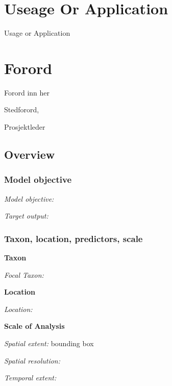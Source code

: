 \documentclass[11pt, a4paper]{article}
\begin{document}
\setcounter{secnumdepth}{0}
\section{Useage Or Application}
\normalsize{
Usage or Application} \\
\normalsize
\clearpage


\doublespacing
\tableofcontents
{}
\singlespacing
\clearpage

\section{Forord}

\normalsize
Forord inn her\par
\medskip
Stedforord, \par
\medskip
Prosjektleder



\clearpage
\setcounter{secnumdepth}{4}
\setlength{\parskip}{6pt}

\hypertarget{overview}{%
\subsection{Overview}\label{overview}}

\hypertarget{model-objective}{%
\subsubsection{Model objective}\label{model-objective}}

\emph{Model objective:}

\emph{Target output:}

\hypertarget{taxon-location-predictors-scale}{%
\subsubsection{Taxon, location, predictors,
scale}\label{taxon-location-predictors-scale}}

\textbf{Taxon}

\emph{Focal Taxon:}

\textbf{Location}

\emph{Location:}

\textbf{Scale of Analysis}

\emph{Spatial extent:} bounding box

\emph{Spatial resolution:}

\emph{Temporal extent:}
\end{document}
